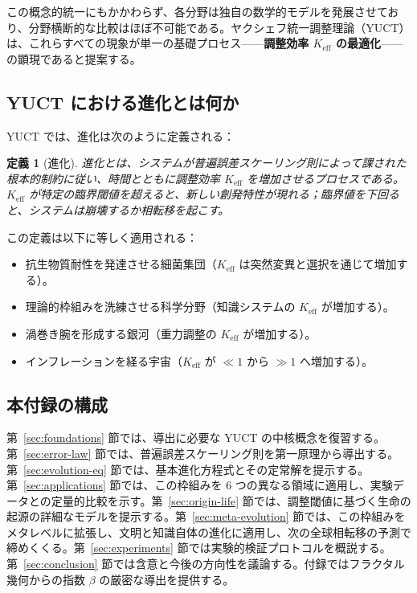 \documentclass[12pt,a4paper]{article}
\newcommand{\Keff}{K_{\mathrm{eff}}}
\newtheorem{definition}[theorem]{定義}
\theoremstyle{remark}
\begin{document}
	この概念的統一にもかかわらず、各分野は独自の数学的モデルを発展させており、分野横断的な比較はほぼ不可能である。ヤクシェフ統一調整理論（YUCT）は、これらすべての現象が単一の基礎プロセス——\textbf{調整効率 \(\Keff\) の最適化}——の顕現であると提案する。
	
	\subsection{YUCT における進化とは何か}
	
	YUCT では、進化は次のように定義される：
	
	\begin{definition}[進化]
		進化とは、システムが普遍誤差スケーリング則によって課された根本的制約に従い、時間とともに調整効率 \(\Keff\) を増加させるプロセスである。\(\Keff\) が特定の臨界閾値を超えると、新しい創発特性が現れる；臨界値を下回ると、システムは崩壊するか相転移を起こす。
	\end{definition}
	
	この定義は以下に等しく適用される：
	
	\begin{itemize}
		\item 抗生物質耐性を発達させる細菌集団（\(\Keff\) は突然変異と選択を通じて増加する）。
		\item 理論的枠組みを洗練させる科学分野（知識システムの \(\Keff\) が増加する）。
		\item 渦巻き腕を形成する銀河（重力調整の \(\Keff\) が増加する）。
		\item インフレーションを経る宇宙（\(\Keff\) が \(\ll 1\) から \(\gg 1\) へ増加する）。
	\end{itemize}
	
	\subsection{本付録の構成}
	
	第~\ref{sec:foundations} 節では、導出に必要な YUCT の中核概念を復習する。第~\ref{sec:error-law} 節では、普遍誤差スケーリング則を第一原理から導出する。第~\ref{sec:evolution-eq} 節では、基本進化方程式とその定常解を提示する。第~\ref{sec:applications} 節では、この枠組みを 6 つの異なる領域に適用し、実験データとの定量的比較を示す。第~\ref{sec:origin-life} 節では、調整閾値に基づく生命の起源の詳細なモデルを提示する。第~\ref{sec:meta-evolution} 節では、この枠組みをメタレベルに拡張し、文明と知識自体の進化に適用し、次の全球相転移の予測で締めくくる。第~\ref{sec:experiments} 節では実験的検証プロトコルを概説する。第~\ref{sec:conclusion} 節では含意と今後の方向性を議論する。付録ではフラクタル幾何からの指数 \(\beta\) の厳密な導出を提供する。
	
\end{document}
